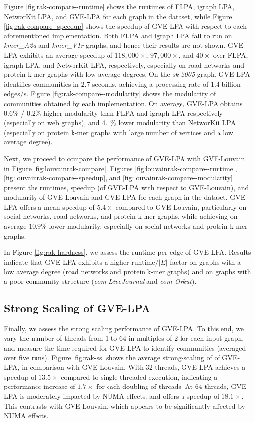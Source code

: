 Figure \ref{fig:rak-compare--runtime} shows the runtimes of FLPA, igraph LPA, NetworKit LPA, and GVE-LPA for each graph in the dataset, while Figure \ref{fig:rak-compare--speedup} shows the speedup of GVE-LPA with respect to each aforementioned implementation. Both FLPA and igraph LPA fail to run on \textit{kmer\_A2a} and \textit{kmer\_V1r} graphs, and hence their results are not shown. GVE-LPA exhibits an average speedup of $118,000\times$, $97,000\times$, and $40\times$ over FLPA, igraph LPA, and NetworKit LPA, respectively, especially on road networks and protein k-mer graphs with low average degrees. On the \textit{sk-2005} graph, GVE-LPA identifies communities in $2.7$ seconds, achieving a processing rate of $1.4$ billion edges/s. Figure \ref{fig:rak-compare--modularity} shows the modularity of communities obtained by each implementation. On average, GVE-LPA obtains $0.6\%$ / $0.2\%$ higher modularity than FLPA and igraph LPA respectively (especially on web graphs), and $4.1\%$ lower modularity than NetworKit LPA (especially on protein k-mer graphs with large number of vertices and a low average degree).




Next, we proceed to compare the performance of GVE-LPA with GVE-Louvain in Figure \ref{fig:louvainrak-compare}. Figures \ref{fig:louvainrak-compare--runtime}, \ref{fig:louvainrak-compare--speedup}, and \ref{fig:louvainrak-compare--modularity} present the runtimes, speedup (of GVE-LPA with respect to GVE-Louvain), and modularity of GVE-Louvain and GVE-LPA for each graph in the dataset. GVE-LPA offers a mean speedup of $5.4\times$ compared to GVE-Louvain, particularly on social networks, road networks, and protein k-mer graphs, while achieving on average $10.9\%$ lower modularity, especially on social networks and protein k-mer graphs.

In Figure \ref{fig:rak-hardness}, we assess the runtime per edge of GVE-LPA. Results indicate that GVE-LPA exhibits a higher $\text{runtime}/|E|$ factor on graphs with a low average degree (road networks and protein k-mer graphs) and on graphs with a poor community structure (\textit{com-LiveJournal} and \textit{com-Orkut}).




\subsection{Strong Scaling of GVE-LPA}

Finally, we assess the strong scaling performance of GVE-LPA. To this end, we vary the number of threads from $1$ to $64$ in multiples of $2$ for each input graph, and measure the time required for GVE-LPA to identify communities (averaged over five runs). Figure \ref{fig:rak-ss} shows the average strong-scaling of of GVE-LPA, in comparison with GVE-Louvain. With 32 threads, GVE-LPA achieves a speedup of $13.5\times$ compared to single-threaded execution, indicating a performance increase of $1.7\times$ for each doubling of threads. At 64 threads, GVE-LPA is moderately impacted by NUMA effects, and offers a speedup of $18.1\times$. This contrasts with GVE-Louvain, which appears to be significantly affected by NUMA effects.
